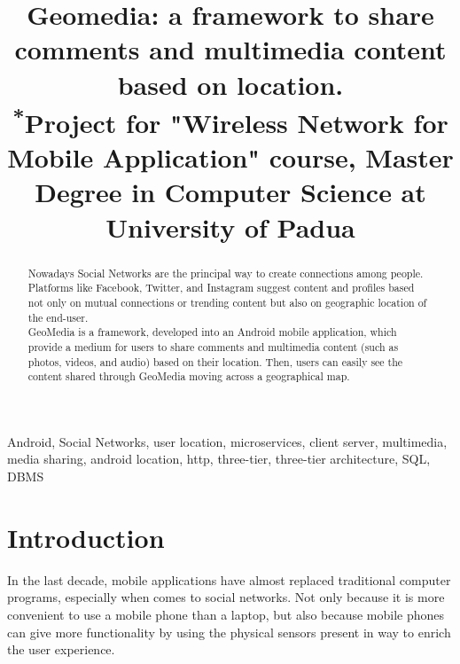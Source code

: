 \documentclass[conference]{IEEEtran}
\begin{document}
\title{Geomedia: a framework to share comments and multimedia content based on location.\\
{\footnotesize \textsuperscript{*}Project for "Wireless Network for Mobile Application" course, Master Degree in Computer Science at University of Padua}
}

\author{
\and
{}
}

\maketitle

\begin{abstract}
Nowadays Social Networks are the principal way to create connections among people.
Platforms like Facebook, Twitter, and Instagram suggest content and profiles based not only on mutual connections or trending content but also on geographic location of the end-user.
\\
GeoMedia is a framework, developed into an Android mobile application, which provide a medium for users to share comments and multimedia content (such as photos, videos, and audio) based on their location.
Then, users can easily see the content shared through GeoMedia moving across a geographical map.
\end{abstract}

\begin{IEEEkeywords}
Android, Social Networks, user location, microservices, client server, multimedia, media sharing, android location, http, three-tier, three-tier architecture, SQL, DBMS
\end{IEEEkeywords}

\section{Introduction}
In the last decade, mobile applications have almost replaced traditional computer programs, especially when comes to social networks. Not only because it is more convenient to use a mobile phone than a laptop, but also because mobile phones can give more functionality by using the physical sensors present in way to enrich the user experience.
\end{document}
